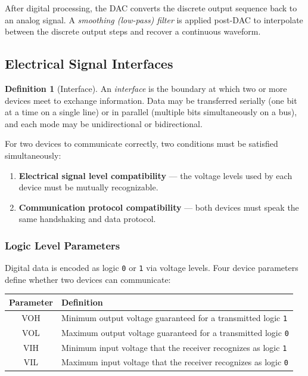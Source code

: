 \documentclass[11pt, a4paper, notitlepage]{report}
\theoremstyle{definition}
\newtheorem{definition}[theorem]{Definition}
\theoremstyle{remark}
\theoremstyle{definition}
\begin{document}
After digital processing, the DAC converts the discrete output sequence back to an analog signal. A \emph{smoothing (low-pass) filter} is applied post-DAC to interpolate between the discrete output steps and recover a continuous waveform.

\subsection{Electrical Signal Interfaces}
\label{sec:electrical-interface}

\begin{definition}[Interface]
  \label{def:interface}
  An \emph{interface} is the boundary at which two or more devices meet to exchange information. Data may be transferred serially (one bit at a time on a single line) or in parallel (multiple bits simultaneously on a bus), and each mode may be unidirectional or bidirectional.
\end{definition}

For two devices to communicate correctly, two conditions must be satisfied simultaneously:
\begin{enumerate}
  \item \textbf{Electrical signal level compatibility} — the voltage levels used by each device must be mutually recognizable.
  \item \textbf{Communication protocol compatibility} — both devices must speak the same handshaking and data protocol.
\end{enumerate}

\subsubsection{Logic Level Parameters}
\label{sec:logic-levels}

Digital data is encoded as logic \texttt{0} or \texttt{1} via voltage levels. Four device parameters define whether two devices can communicate:

\begin{center}
\renewcommand{\arraystretch}{1.3}
\begin{tabular}{>{\ttfamily}cl}
  \toprule
  \normalfont Parameter & Definition \\
  \midrule
  VOH & Minimum output voltage guaranteed for a transmitted logic \texttt{1} \\
  VOL & Maximum output voltage guaranteed for a transmitted logic \texttt{0} \\
  VIH & Minimum input voltage that the receiver recognizes as logic \texttt{1} \\
  VIL & Maximum input voltage that the receiver recognizes as logic \texttt{0} \\
  \bottomrule
\end{tabular}
\end{center}
\end{document}
